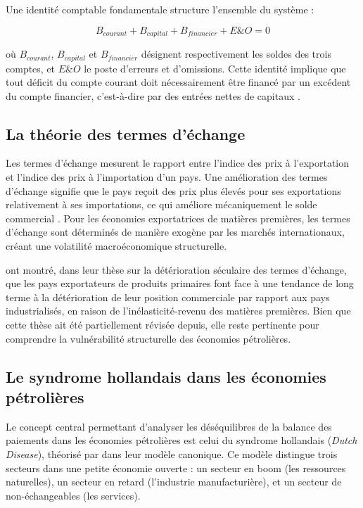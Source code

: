 \documentclass[12pt,a4paper]{article}
\begin{document}
Une identité comptable fondamentale structure l'ensemble du système :

\begin{equation}
  B_{courant} + B_{capital} + B_{financier} + E\&O = 0
  \label{eq:identite_bdp}
\end{equation}

où $B_{courant}$, $B_{capital}$ et $B_{financier}$ désignent respectivement les soldes des
trois comptes, et $E\&O$ le poste d'erreurs et d'omissions. Cette identité implique que tout
déficit du compte courant doit nécessairement être financé par un excédent du compte
financier, c'est-à-dire par des entrées nettes de capitaux \parencite{krugmanobstfeld2018}.

\subsection{La théorie des termes d'échange}

Les termes d'échange mesurent le rapport entre l'indice des prix à l'exportation et l'indice
des prix à l'importation d'un pays. Une amélioration des termes d'échange signifie que le
pays reçoit des prix plus élevés pour ses exportations relativement à ses importations,
ce qui améliore mécaniquement le solde commercial \parencite{prebischsinger1950}. Pour les
économies exportatrices de matières premières, les termes d'échange sont déterminés de
manière exogène par les marchés internationaux, créant une volatilité macroéconomique
structurelle.

\textcite{prebischsinger1950} ont montré, dans leur thèse sur la détérioration séculaire des
termes d'échange, que les pays exportateurs de produits primaires font face à une tendance
de long terme à la détérioration de leur position commerciale par rapport aux pays
industrialisés, en raison de l'inélasticité-revenu des matières premières. Bien que cette
thèse ait été partiellement révisée depuis, elle reste pertinente pour comprendre la
vulnérabilité structurelle des économies pétrolières.

\subsection{Le syndrome hollandais dans les économies pétrolières}

Le concept central permettant d'analyser les déséquilibres de la balance des paiements dans
les économies pétrolières est celui du syndrome hollandais (\textit{Dutch Disease}), théorisé
par \textcite{cordenneary1982} dans leur modèle canonique. Ce modèle distingue trois secteurs
dans une petite économie ouverte : un secteur en boom (les ressources naturelles), un secteur
en retard (l'industrie manufacturière), et un secteur de non-échangeables (les services).
\end{document}

